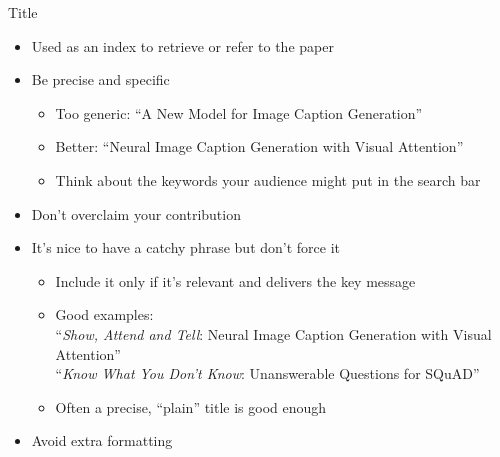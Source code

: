 \documentclass[usenames,dvipsnames,notes]{beamer}
\begin{document}
\begin{frame}
    {Title}
    \begin{itemize}
        \item Used as an index to retrieve or refer to the paper
        \item Be precise and specific
            \begin{itemize}
                \item Too generic: ``A New Model for Image Caption Generation''
                \item Better: ``Neural Image Caption Generation with Visual Attention''
                \item Think about the keywords your audience might put in the search bar
            \end{itemize}
        \item Don't overclaim your contribution
        \item It's nice to have a catchy phrase but don't force it 
            \begin{itemize}
                \item Include it only if it's relevant and delivers the key message
                \item Good examples: \\
                    ``\emph{Show, Attend and Tell}: Neural Image Caption Generation with Visual Attention''\\
                    ``\emph{Know What You Don't Know}: Unanswerable Questions for SQuAD''
                \item Often a precise, ``plain'' title is good enough
            \end{itemize}
        \item Avoid extra formatting 
    \end{itemize}
\end{frame}
\end{document}
